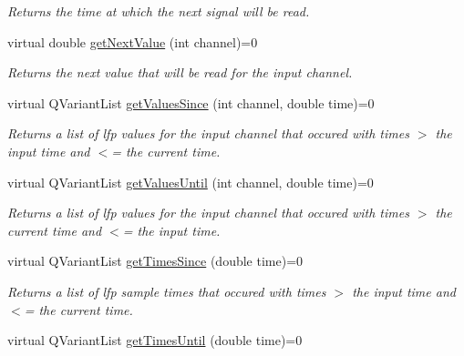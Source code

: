 \begin{DoxyCompactItemize}
\begin{DoxyCompactList}\small\item\em Returns the time at which the next signal will be read. \end{DoxyCompactList}\item 
\hypertarget{class_picto_1_1_lfp_reader_ac887cdc345de5c9ffb8321dda3fea8d8}{virtual double \hyperlink{class_picto_1_1_lfp_reader_ac887cdc345de5c9ffb8321dda3fea8d8}{get\-Next\-Value} (int channel)=0}\label{class_picto_1_1_lfp_reader_ac887cdc345de5c9ffb8321dda3fea8d8}

\begin{DoxyCompactList}\small\item\em Returns the next value that will be read for the input channel. \end{DoxyCompactList}\item 
\hypertarget{class_picto_1_1_lfp_reader_a2a203fbd2691534aa7c0cfa94e3d0629}{virtual Q\-Variant\-List \hyperlink{class_picto_1_1_lfp_reader_a2a203fbd2691534aa7c0cfa94e3d0629}{get\-Values\-Since} (int channel, double time)=0}\label{class_picto_1_1_lfp_reader_a2a203fbd2691534aa7c0cfa94e3d0629}

\begin{DoxyCompactList}\small\item\em Returns a list of lfp values for the input channel that occured with times $>$ the input time and $<$= the current time. \end{DoxyCompactList}\item 
\hypertarget{class_picto_1_1_lfp_reader_af87044267aefc42bf205d54dff096144}{virtual Q\-Variant\-List \hyperlink{class_picto_1_1_lfp_reader_af87044267aefc42bf205d54dff096144}{get\-Values\-Until} (int channel, double time)=0}\label{class_picto_1_1_lfp_reader_af87044267aefc42bf205d54dff096144}

\begin{DoxyCompactList}\small\item\em Returns a list of lfp values for the input channel that occured with times $>$ the current time and $<$= the input time. \end{DoxyCompactList}\item 
\hypertarget{class_picto_1_1_lfp_reader_ac410265615b1d6f35d01efd9c09d4217}{virtual Q\-Variant\-List \hyperlink{class_picto_1_1_lfp_reader_ac410265615b1d6f35d01efd9c09d4217}{get\-Times\-Since} (double time)=0}\label{class_picto_1_1_lfp_reader_ac410265615b1d6f35d01efd9c09d4217}

\begin{DoxyCompactList}\small\item\em Returns a list of lfp sample times that occured with times $>$ the input time and $<$= the current time. \end{DoxyCompactList}\item 
\hypertarget{class_picto_1_1_lfp_reader_a1652350b92434aca961a273a781b7765}{virtual Q\-Variant\-List \hyperlink{class_picto_1_1_lfp_reader_a1652350b92434aca961a273a781b7765}{get\-Times\-Until} (double time)=0}\label{class_picto_1_1_lfp_reader_a1652350b92434aca961a273a781b7765}


\end{DoxyCompactItemize}
